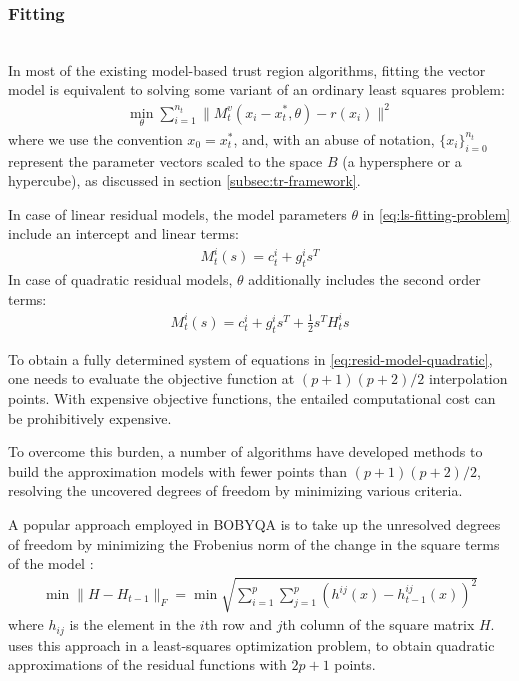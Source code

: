 \subsubsection{Fitting}
\label{subsubsec:fitting}
\hfill\\


In most of the existing model-based trust region algorithms, fitting the vector model is equivalent to solving some variant of an ordinary least squares problem:
\begin{align}
    \min\limits_{\theta}\sum\limits_{i=1}^{n_t}\lVert M_t^v(x_i-x_t^*,\theta)-r(x_i)\rVert^2
    \label{eq:ls-fitting-problem}
\end{align}
where we use the convention $x_0=x_t^*$, and, with an abuse of notation, $\{x_i\}_{i=0}^{n_t}$ represent the parameter vectors scaled to the space $B$ (a hypersphere or a hypercube), as discussed in section \ref{subsec:tr-framework}.

In case of linear residual models, the model parameters $\theta$ in \ref{eq:ls-fitting-problem} include an intercept and linear terms:
\begin{align}
    M_t^i(s)= c^i_t+g_t^is^T
    \label{eq:resid-model-linear}
\end{align}
In case of quadratic residual models, $\theta$ additionally includes the second order terms:
\begin{align}
    M_t^i(s)= c^i_t+g_t^is^T+\frac{1}{2}s^TH_t^is
    \label{eq:resid-model-quadratic}
\end{align}

To obtain a fully determined system of equations in \ref{eq:resid-model-quadratic}, one needs to evaluate the objective function at $(p+1)(p+2)/2$ interpolation points. With expensive objective functions, the entailed computational cost can be prohibitively expensive.

To overcome this burden, a number of algorithms have developed methods to build the approximation models with fewer points than  $(p+1)(p+2)/2$, resolving the uncovered degrees of freedom by minimizing various criteria.

A popular approach employed in BOBYQA is to take up the unresolved degrees of freedom by minimizing the Frobenius norm of the change in the square terms of the model \citet{Powell2003}:
\begin{align}
    \min\lVert H-H_{t-1}\rVert_F = \min\sqrt{\sum\limits_{i=1}^p\sum\limits_{j=1}^{p}(h^{ij}(x)-h^{ij}_{t-1}(x))^2}
    \label{eq:min-frob-diff}
\end{align}
where $h_{ij}$ is the element in the $i$th row and $j$th column of the square matrix $H$. \cite{Zhang2010} uses this approach in a least-squares optimization problem, to obtain quadratic approximations of the residual functions with $2p+1$ points.

